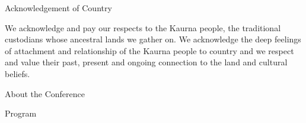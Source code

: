 \documentclass[twoside,14pt,a4paper,notitlepage]{memoir}
\newcounter{chapternonum}
\begin{document}
\pagestyle{plain}



\setcounter{tocdepth}{2}
\tableofcontents
\vfill

\pagebreak
\vspace*{2cm}
{\Huge Acknowledgement of Country}
\vspace{2cm}

We acknowledge and pay our respects to the Kaurna people, the traditional custodians whose ancestral lands we gather on. We acknowledge the deep feelings of attachment and relationship of the Kaurna people to country and we respect and value their past, present and ongoing connection to the land and cultural beliefs.
\vfill

\pagebreak
\vspace*{2cm}
{\Huge About the Conference}
\vspace{2cm}

\lipsum[1-2]
\vfill


%

\pagebreak
\vspace*{2cm}
{\Huge Program}
\vspace{2cm}
\end{document}

